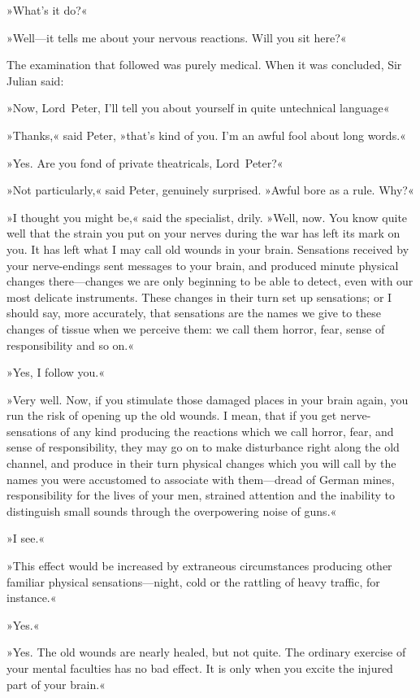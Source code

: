»What's it do?«

»Well—it tells me about your nervous reactions. Will you sit here?«

The examination that followed was purely medical. When it was concluded, Sir Julian said:

»Now, Lord~Peter, I'll tell you about yourself in quite untechnical language\longdash«

»Thanks,« said Peter, »that's kind of you. I'm an awful fool about long words.«

»Yes. Are you fond of private theatricals, Lord~Peter?«

»Not particularly,« said Peter, genuinely surprised. »Awful bore as a rule. Why?«

»I thought you might be,« said the specialist, drily. »Well, now. You know quite well that the strain you put on your nerves during the war has left its mark on you. It has left what I may call old wounds in your brain. Sensations received by your nerve-endings sent messages to your brain, and produced minute physical changes there—changes we are only beginning to be able to detect, even with our most delicate instruments. These changes in their turn set up sensations; or I should say, more accurately, that sensations are the names we give to these changes of tissue when we perceive them: we call them horror, fear, sense of responsibility and so on.«

»Yes, I follow you.«

»Very well. Now, if you stimulate those damaged places in your brain again, you run the risk of opening up the old wounds. I mean, that if you get nerve-sensations of any kind producing the reactions which we call horror, fear, and sense of responsibility, they may go on to make disturbance right along the old channel, and produce in their turn physical changes which you will call by the names you were accustomed to associate with them—dread of German mines, responsibility for the lives of your men, strained attention and the inability to distinguish small sounds through the overpowering noise of guns.«

»I see.«

»This effect would be increased by extraneous circumstances producing other familiar physical sensations—night, cold or the rattling of heavy traffic, for instance.«

»Yes.«

»Yes. The old wounds are nearly healed, but not quite. The ordinary exercise of your mental faculties has no bad effect. It is only when you excite the injured part of your brain.«

